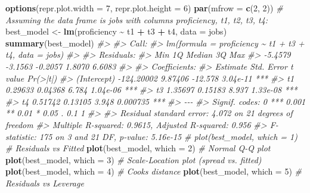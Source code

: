 \documentclass[
]{article}
\newenvironment{Shaded}{\begin{snugshade}}{\end{snugshade}}
\newcommand{\AttributeTok}[1]{\textcolor[rgb]{0.13,0.29,0.53}{#1}}
\newcommand{\CommentTok}[1]{\textcolor[rgb]{0.56,0.35,0.01}{\textit{#1}}}
\newcommand{\DecValTok}[1]{\textcolor[rgb]{0.00,0.00,0.81}{#1}}
\newcommand{\FunctionTok}[1]{\textcolor[rgb]{0.13,0.29,0.53}{\textbf{#1}}}
\newcommand{\NormalTok}[1]{#1}
\newcommand{\OtherTok}[1]{\textcolor[rgb]{0.56,0.35,0.01}{#1}}
\newcommand{\SpecialCharTok}[1]{\textcolor[rgb]{0.81,0.36,0.00}{\textbf{#1}}}
\begin{document}
\begin{Shaded}
\begin{Highlighting}[]
\FunctionTok{options}\NormalTok{(}\AttributeTok{repr.plot.width =} \DecValTok{7}\NormalTok{, }\AttributeTok{repr.plot.height =} \DecValTok{6}\NormalTok{)}
\FunctionTok{par}\NormalTok{(}\AttributeTok{mfrow =} \FunctionTok{c}\NormalTok{(}\DecValTok{2}\NormalTok{, }\DecValTok{2}\NormalTok{))}
\CommentTok{\# Assuming the data frame is \textquotesingle{}jobs\textquotesingle{} with columns proficiency, t1, t2, t3, t4:}
\NormalTok{best\_model }\OtherTok{\textless{}{-}} \FunctionTok{lm}\NormalTok{(proficiency }\SpecialCharTok{\textasciitilde{}}\NormalTok{ t1 }\SpecialCharTok{+}\NormalTok{ t3 }\SpecialCharTok{+}\NormalTok{ t4, }\AttributeTok{data =}\NormalTok{ jobs)}
\FunctionTok{summary}\NormalTok{(best\_model)}
\CommentTok{\#\textgreater{} }
\CommentTok{\#\textgreater{} Call:}
\CommentTok{\#\textgreater{} lm(formula = proficiency \textasciitilde{} t1 + t3 + t4, data = jobs)}
\CommentTok{\#\textgreater{} }
\CommentTok{\#\textgreater{} Residuals:}
\CommentTok{\#\textgreater{}     Min      1Q  Median      3Q     Max }
\CommentTok{\#\textgreater{} {-}5.4579 {-}3.1563 {-}0.2057  1.8070  6.6083 }
\CommentTok{\#\textgreater{} }
\CommentTok{\#\textgreater{} Coefficients:}
\CommentTok{\#\textgreater{}               Estimate Std. Error t value Pr(\textgreater{}|t|)    }
\CommentTok{\#\textgreater{} (Intercept) {-}124.20002    9.87406 {-}12.578 3.04e{-}11 ***}
\CommentTok{\#\textgreater{} t1             0.29633    0.04368   6.784 1.04e{-}06 ***}
\CommentTok{\#\textgreater{} t3             1.35697    0.15183   8.937 1.33e{-}08 ***}
\CommentTok{\#\textgreater{} t4             0.51742    0.13105   3.948 0.000735 ***}
\CommentTok{\#\textgreater{} {-}{-}{-}}
\CommentTok{\#\textgreater{} Signif. codes:  0 \textquotesingle{}***\textquotesingle{} 0.001 \textquotesingle{}**\textquotesingle{} 0.01 \textquotesingle{}*\textquotesingle{} 0.05 \textquotesingle{}.\textquotesingle{} 0.1 \textquotesingle{} \textquotesingle{} 1}
\CommentTok{\#\textgreater{} }
\CommentTok{\#\textgreater{} Residual standard error: 4.072 on 21 degrees of freedom}
\CommentTok{\#\textgreater{} Multiple R{-}squared:  0.9615, Adjusted R{-}squared:  0.956 }
\CommentTok{\#\textgreater{} F{-}statistic:   175 on 3 and 21 DF,  p{-}value: 5.16e{-}15}
\CommentTok{\# plot(best\_model, which = 1)  \# Residuals vs Fitted}
\FunctionTok{plot}\NormalTok{(best\_model, }\AttributeTok{which =} \DecValTok{2}\NormalTok{)  }\CommentTok{\# Normal Q{-}Q plot}
\FunctionTok{plot}\NormalTok{(best\_model, }\AttributeTok{which =} \DecValTok{3}\NormalTok{)  }\CommentTok{\# Scale{-}Location plot (spread vs. fitted)}
\FunctionTok{plot}\NormalTok{(best\_model, }\AttributeTok{which =} \DecValTok{4}\NormalTok{)  }\CommentTok{\# Cook\textquotesingle{}s distance}
\FunctionTok{plot}\NormalTok{(best\_model, }\AttributeTok{which =} \DecValTok{5}\NormalTok{)  }\CommentTok{\# Residuals vs Leverage}
\end{Highlighting}
\end{Shaded}
\end{document}

